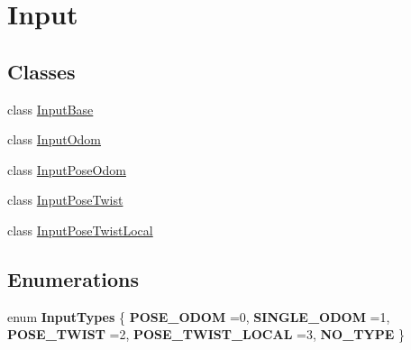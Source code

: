 \hypertarget{group__Input}{}\section{Input}
\label{group__Input}
\subsection*{Classes}
\begin{DoxyCompactItemize}
\item 
class \hyperlink{classInputBase}{Input\+Base}
\item 
class \hyperlink{classInputOdom}{Input\+Odom}
\item 
class \hyperlink{classInputPoseOdom}{Input\+Pose\+Odom}
\item 
class \hyperlink{classInputPoseTwist}{Input\+Pose\+Twist}
\item 
class \hyperlink{classInputPoseTwistLocal}{Input\+Pose\+Twist\+Local}
\end{DoxyCompactItemize}
\subsection*{Enumerations}
\begin{DoxyCompactItemize}
\item 
\mbox{\label{group__Input_gaf4789bd72e7b14daae9ed61dbc059261}} 
enum {\bfseries Input\+Types} \{ \newline
{\bfseries P\+O\+S\+E\+\_\+\+O\+D\+OM} =0, 
{\bfseries S\+I\+N\+G\+L\+E\+\_\+\+O\+D\+OM} =1, 
{\bfseries P\+O\+S\+E\+\_\+\+T\+W\+I\+ST} =2, 
{\bfseries P\+O\+S\+E\+\_\+\+T\+W\+I\+S\+T\+\_\+\+L\+O\+C\+AL} =3, 
\newline
{\bfseries N\+O\+\_\+\+T\+Y\+PE}
 \}
\end{DoxyCompactItemize}
